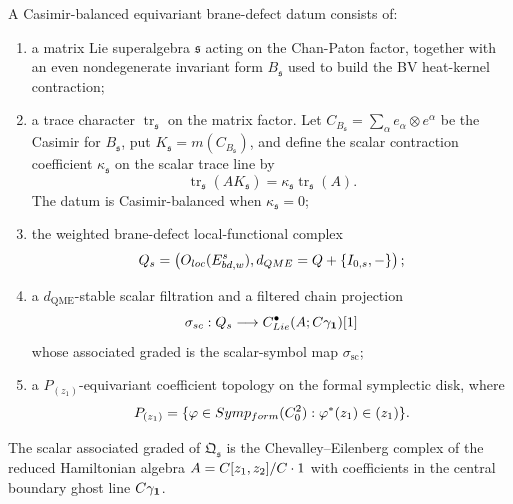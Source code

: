 \begin{defn}\label{defn:super-balanced-equivariant-qme-datum}
  A Casimir-balanced equivariant brane-defect datum consists of:
  \begin{enumerate}[label=(\roman*)]
    \item a matrix Lie superalgebra \(\mathfrak s\) acting on the
      Chan-Paton factor, together with an even nondegenerate invariant
      form \(B_{\mathfrak s}\) used to build the BV heat-kernel
      contraction;
    \item a trace character \(\operatorname{tr}_{\mathfrak s}\) on the
      matrix factor.  Let
      \(C_{B_{\mathfrak s}}=\sum_\alpha e_\alpha\otimes e^\alpha\) be the
      Casimir for \(B_{\mathfrak s}\), put
      \(K_{\mathfrak s}=m(C_{B_{\mathfrak s}})\), and define the scalar
      contraction coefficient \(\kappa_{\mathfrak s}\) on the scalar
      trace line by
      \[
        \operatorname{tr}_{\mathfrak s}(A K_{\mathfrak s})
        =
        \kappa_{\mathfrak s}\operatorname{tr}_{\mathfrak s}(A).
      \]
      The datum is Casimir-balanced when \(\kappa_{\mathfrak s}=0\);
    \item the weighted brane-defect local-functional complex
      \[
        Q_{s}=
        \left(
        O_{loc}(E^{s}_{bd,w}),
        d_{QME}=Q+\{I_{0,s},-\}
        \right);
      \]
    \item a \(d_{\mathrm{QME}}\)-stable scalar filtration and a filtered
      chain projection
      \[
        \sigma_{sc}:
        Q_{s}
        \longrightarrow
        C^\bullet_{Lie}(A;C\gamma_{\mathbf 1})[1]
      \]
      whose associated graded is the scalar-symbol map
      \(\sigma_{\mathrm{sc}}\);
    \item a \(P_{(z_1)}\)-equivariant coefficient topology on the formal
      symplectic disk, where
      \[
        P_{(z_1)}=\{\varphi\in
        Symp_{form}(C^2_0):
        \varphi^*(z_1)\in (z_1)\}.
      \]
  \end{enumerate}
  The scalar associated graded of \(\mathfrak Q_{\mathfrak s}\) is the
  Chevalley--Eilenberg complex of the reduced Hamiltonian algebra
  \(A=C[z_1,z_2]/C\cdot1\) with coefficients in the central
  boundary ghost line \(C\gamma_{\mathbf 1}\).
\end{defn}

